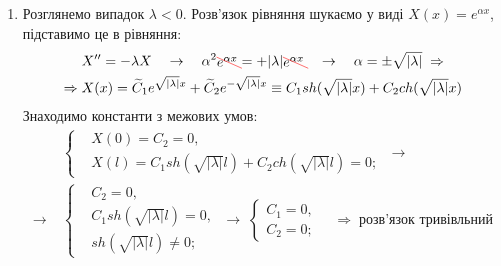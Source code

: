\documentclass[a4paper, 14pt]{extreport}
\begin{document}
\begin{enumerate}
\begin{enumerate}
        \item Розглянемо випадок $\lambda < 0$. Розв'язок рівняння шукаємо у виді $X(x) = e^{\alpha x}$, підставимо це в рівняння: 
        \begin{equation*}
            \begin{aligned}
                &X^{\prime\prime} = -\lambda X
                \quad\to\quad
                \alpha^2 \textcolor{red}{\begin{xy}*{\textcolor{black}{e^{\alpha x}}};p+LU;+RD**h@{}+/\jot/**h@{-}\end{xy}} = +|\lambda| \textcolor{red}{\begin{xy}*{\textcolor{black}{e^{\alpha x}}};p+LU;+RD**h@{}+/\jot/**h@{-}\end{xy}}
                \quad\to\quad
                \alpha = \pm \sqrt{|\lambda|}
                \;\Rightarrow\\
                \Rightarrow\;
                &X(x) = \widetilde{C}_1 e^{\sqrt{|\lambda|}x} + \widetilde{C}_2 e^{-\sqrt{|\lambda|}x} \equiv C_1 sh(\sqrt{|\lambda|}x) + C_2 ch({\sqrt{|\lambda|}x})
            \end{aligned}
        \end{equation*}
        Знаходимо константи з межових умов:
        \begin{equation*}
            \begin{aligned}
                &\left\{ \begin{aligned}
                    &X(0) = C_2 = 0, \\ 
                    &X(l) = C_1 sh(\sqrt{|\lambda|}l) + C_2 ch({\sqrt{|\lambda|}l}) = 0;
                \end{aligned} \right.
                \;\to\\
                \to\;
                &\left\{ \begin{aligned}
                    &C_2 = 0, \\ 
                    &C_1 sh(\sqrt{|\lambda|}l) = 0, \\
                    &sh(\sqrt{|\lambda|}l) \neq 0;
                \end{aligned} \right.
                \;\to\;
                \left\{ \begin{aligned}
                    C_1 = 0, \\ 
                    C_2 = 0;
                \end{aligned} \right.
                \quad\Rightarrow\;
                \text{розв'язок тривівльний}
            \end{aligned}
        \end{equation*}
    

\end{enumerate}
\end{enumerate}
\end{document}
